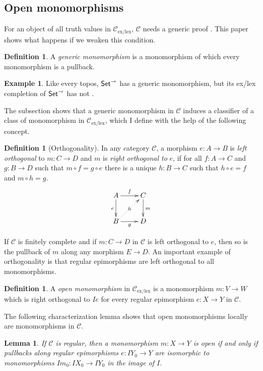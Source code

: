 \documentclass[sort&compress]{elsarticle}
\theoremstyle{plain}
\newtheorem{lemma}[theorem]{Lemma}
\theoremstyle{definition}
\newtheorem{defin}[theorem]{Definition}
\newtheorem{example}[theorem]{Example}
\theoremstyle{remark}
\newcommand\cat\mathcal
\newcommand\exlex{_\mathrm{ex/lex}}
\begin{document}
\subsection{Open monomorphisms}
For an object of all truth values in $\cat C\exlex$, $\cat C$ needs a generic proof \citep{MR1948025}. This paper shows what happens if we weaken this condition.

\begin{defin} A \emph{generic monomorphism} is a monomorphism of which every monomorphism is a pullback. \end{defin}

\begin{example} Like every topos, $\mathsf{Set}^\to$ has a generic monomorphism, but its ex/lex completion of $\mathsf{Set}^\to$ has not \citep[lemma 2.4]{MR2320014}. \end{example}

The subsection shows that a generic monomorphism in $\cat C$ induces a classifier of a class of monomorphism in $\cat C\exlex$, which I define with the help of the following concept.


\begin{defin}[Orthogonality] In any category $\cat C$, a morphism $e:A\to B$ is \emph{left orthogonal} to $m:C\to D$ and $m$ is \emph{right orthogonal to } $e$, if for all $f:A\to C$ and $g:B\to D$ such that $m\circ f = g\circ e$ there is a unique $h:B\to C$ such that $h\circ e = f$ and $m\circ h = g$.
\[ \xymatrix{
A \ar[r]^f\ar[d]_e & C \ar[d]^{m} \\
B \ar[r]_g \ar@{.>}[ur]|h & D
} \]
\end{defin}

If $\cat C$ is finitely complete and if $m:C\to D$ in $\cat C$ is left orthogonal to $e$, then so is the pullback of $m$ along any morphism $E\to D$. An important example of orthogonality is that regular epimorphisms are left orthogonal to all monomorphisms.

\begin{defin} A \emph{open monomorphism} in $\cat C\exlex$ is a monomorphism $m:V\to W$  which is right orthogonal to $Ie$ for every regular epimorphism $e:X\to Y$ in $\cat C$. \end{defin}

The following characterization lemma shows that open monomorphisms locally are monomorphisms in $\cat C$.

\begin{lemma} If $\cat C$ is regular, then a monomorphism $m:X\to Y$ is open if and only if pullbacks along regular epimorphisms $e:IY_0 \to Y$ are isomorphic to monomorphisms $Im_0:IX_0 \to IY_0$ in the image of $I$. \label{charclosed}\end{lemma}
\end{document}
